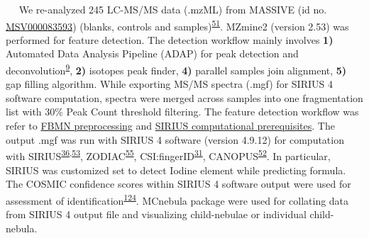    We re-analyzed 245 LC-MS/MS data (.mzML) from MASSIVE (id no.
\href{https://massive.ucsd.edu/ProteoSAFe/QueryMSV?id=MSV000079949}{MSV000083593})
(blanks, controls and
samples)\textsuperscript{\protect\hyperlink{ref-2020s}{51}}. MZmine2
(version 2.53) was performed for feature detection. The detection
workflow mainly involves \textbf{1)} Automated Data Analysis Pipeline
(ADAP) for peak detection and
deconvolution\textsuperscript{\protect\hyperlink{ref-2017f}{9}},
\textbf{2)} isotopes peak finder, \textbf{4)} parallel samples join
alignment, \textbf{5)} gap filling algorithm. While exporting MS/MS
spectra (.mgf) for SIRIUS 4 software computation, spectra were merged
across samples into one fragmentation list with 30\% Peak Count
threshold filtering. The feature detection workflow was refer to
\href{https://ccms-ucsd.github.io/GNPSDocumentation/featurebasedmolecularnetworking-with-mzmine2/}{FBMN
preprocessing} and
\href{https://boecker-lab.github.io/docs.sirius.github.io/prerequisites/}{SIRIUS
computational prerequisites}. The output .mgf was run with SIRIUS 4
software (version 4.9.12) for computation with
SIRIUS\textsuperscript{\protect\hyperlink{ref-2019}{36},\protect\hyperlink{ref-2009}{53}},
ZODIAC\textsuperscript{\protect\hyperlink{ref-2020a}{55}},
CSI:fingerID\textsuperscript{\protect\hyperlink{ref-2015a}{31}},
CANOPUS\textsuperscript{\protect\hyperlink{ref-2021a}{52}}. In
particular, SIRIUS was customized set to detect Iodine element while
predicting formula. The COSMIC confidence scores within SIRIUS 4
software output were used for assessment of
identification\textsuperscript{\protect\hyperlink{ref-2021c}{124}}.
MCnebula package were used for collating data from SIRIUS 4 output file
and visualizing child-nebulae or individual child-nebula.

